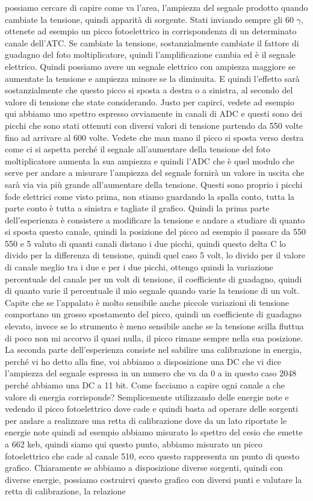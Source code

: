 possiamo cercare di capire come va l'area, l'ampiezza del segnale prodotto quando cambiate la tensione, quindi apparità di sorgente. Stati inviando sempre gli 60 $\gamma$, ottenete ad esempio un picco fotoelettrico in corrispondenza di un determinato canale dell'ATC. Se cambiate la tensione, sostanzialmente cambiate il fattore di guadagno del foto moltiplicatore, quindi l'amplificazione cambia ed è il segnale elettrico. Quindi possiamo avere un segnale elettrico con ampiezza maggiore se aumentate la tensione e ampiezza minore se la diminuita. E quindi l'effetto sarà sostanzialmente che questo picco si sposta a destra o a sinistra, al secondo del valore di tensione che state considerando. Justo per capirci, vedete ad esempio qui abbiamo uno spettro espresso ovviamente in canali di ADC e questi sono dei picchi che sono stati ottenuti con diversi valori di tensione partendo da 550 volte fino ad arrivare al 600 volte. Vedete che man mano il picco si sposta verso destra come ci si aspetta perché il segnale all'aumentare della tensione del foto moltiplicatore aumenta la sua ampiezza e quindi l'ADC che è quel modulo che serve per andare a misurare l'ampiezza del segnale fornirà un valore in uscita che sarà via via più grande all'aumentare della tensione. Questi sono proprio i picchi fode elettrici come visto prima, non stiamo guardando la spalla conto, tutta la parte conto è tutta a sinistra e tagliate il grafico. Quindi la prima parte dell'esperienza è consistere a modificare la tensione e andare a studiare di quanto si sposta questo canale, quindi la posizione del picco ad esempio il passare da 550 550 e 5 valuto di quanti canali distano i due picchi, quindi questo delta C lo divido per la differenza di tensione, quindi quel caso 5 volt, lo divido per il valore di canale meglio tra i due e per i due picchi, ottengo quindi la variazione percentuale del canale per un volt di tensione, il coefficiente di guadagno, quindi di quanto varie il percentuale il mio segnale quando varie la tensione di un volt. Capite che se l'appalato è molto sensibile anche piccole variazioni di tensione comportano un grosso spostamento del picco, quindi un coefficiente di guadagno elevato, invece se lo strumento è meno sensibile anche se la tensione scilla fluttua di poco non mi accorvo il quasi nulla, il picco rimane sempre nella sua posizione. La seconda parte dell'esperienza consiste nel sabilire una calibrazione in energia, perché vi ho detto alla fine, voi abbiamo a disposizione una DC che vi dice l'ampiezza del segnale espressa in un numero che va da 0 a in questo caso 2048 perché abbiamo una DC a 11 bit. Come facciamo a capire ogni canale a che valore di energia corrisponde? Semplicemente utilizzando delle energie note e vedendo il picco fotoelettrico dove cade e quindi basta ad operare delle sorgenti per andare a realizzare una retta di calibrazione dove da un lato riportate le energie note quindi ad esempio abbiamo misurato lo spettro del cesio che emette a 662 keb, quindi siamo qui questo punto, abbiamo misurato un picco fotoelettrico che cade al canale 510, ecco questo rappresenta un punto di questo grafico. Chiaramente se abbiamo a disposizione diverse sorgenti, quindi con diverse energie, possiamo costruirvi questo grafico con diversi punti e valutare la retta di calibrazione, la relazione 